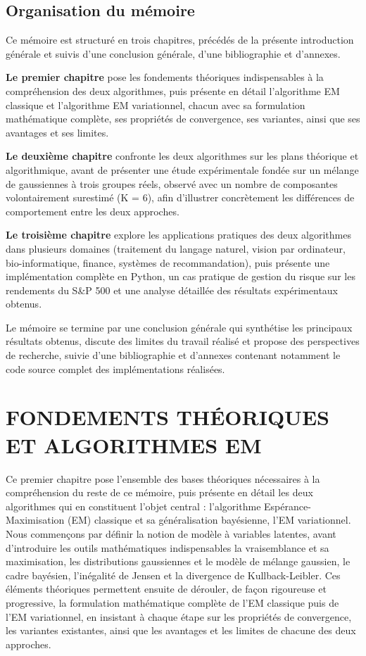 \section*{Organisation du mémoire}
Ce mémoire est structuré en trois chapitres, précédés de la présente introduction générale et suivis d'une conclusion générale, d'une bibliographie et d'annexes.

\textbf{Le premier chapitre} pose les fondements théoriques indispensables à la compréhension des deux algorithmes, puis présente en détail l'algorithme EM classique et l'algorithme EM variationnel, chacun avec sa formulation mathématique complète, ses propriétés de convergence, ses variantes, ainsi que ses avantages et ses limites.

\textbf{Le deuxième chapitre} confronte les deux algorithmes sur les plans théorique et algorithmique, avant de présenter une étude expérimentale fondée sur un mélange de gaussiennes à trois groupes réels, observé avec un nombre de composantes volontairement surestimé (K = 6), afin d'illustrer concrètement les différences de comportement entre les deux approches.

\textbf{Le troisième chapitre} explore les applications pratiques des deux algorithmes dans plusieurs domaines (traitement du langage naturel, vision par ordinateur, bio-informatique, finance, systèmes de recommandation), puis présente une implémentation complète en Python, un cas pratique de gestion du risque sur les rendements du S\&P 500 et une analyse détaillée des résultats expérimentaux obtenus.

Le mémoire se termine par une conclusion générale qui synthétise les principaux résultats obtenus, discute des limites du travail réalisé et propose des perspectives de recherche, suivie d'une bibliographie et d'annexes contenant notamment le code source complet des implémentations réalisées.


\chapter{FONDEMENTS THÉORIQUES ET ALGORITHMES EM}
Ce premier chapitre pose l'ensemble des bases théoriques nécessaires à la compréhension du reste de ce mémoire, puis présente en détail les deux algorithmes qui en constituent l'objet central : l'algorithme Espérance-Maximisation (EM) classique et sa généralisation bayésienne, l'EM variationnel. Nous commençons par définir la notion de modèle à variables latentes, avant d'introduire les outils mathématiques indispensables  la vraisemblance et sa maximisation, les distributions gaussiennes et le modèle de mélange gaussien, le cadre bayésien, l'inégalité de Jensen et la divergence de Kullback-Leibler. Ces éléments théoriques permettent ensuite de dérouler, de façon rigoureuse et progressive, la formulation mathématique complète de l'EM classique puis de l'EM variationnel, en insistant à chaque étape sur les propriétés de convergence, les variantes existantes, ainsi que les avantages et les limites de chacune des deux approches.

